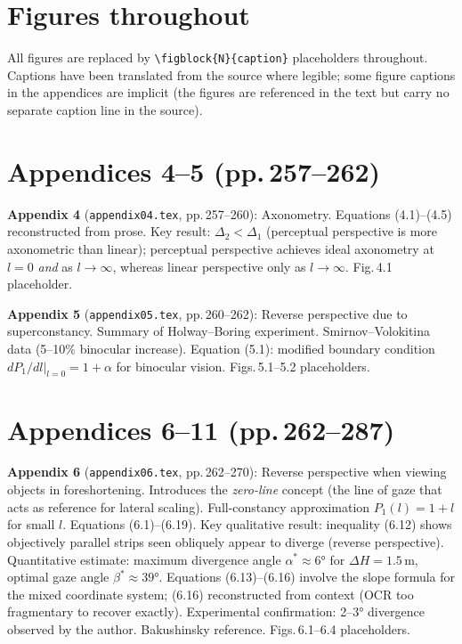 \documentclass[12pt]{article}
\begin{document}
\section*{Figures throughout}

All figures are replaced by \verb|\figblock{N}{caption}| placeholders
throughout. Captions have been translated from the source where legible; some
figure captions in the appendices are implicit (the figures are referenced in
the text but carry no separate caption line in the source).

\section*{Appendices 4--5 (pp.\,257--262)}

\textbf{Appendix 4} (\texttt{appendix04.tex}, pp.\,257--260): Axonometry. Equations
(4.1)--(4.5) reconstructed from prose. Key result: $\Delta_2 < \Delta_1$ (perceptual
perspective is more axonometric than linear); perceptual perspective achieves ideal
axonometry at $l=0$ \emph{and} as $l\to\infty$, whereas linear perspective only as
$l\to\infty$. Fig.\,4.1 placeholder.

\textbf{Appendix 5} (\texttt{appendix05.tex}, pp.\,260--262): Reverse perspective due to
superconstancy. Summary of Holway--Boring experiment. Smirnov--Volokitina data (5--10\%
binocular increase). Equation (5.1): modified boundary condition
$dP_1/dl|_{l=0} = 1+\alpha$ for binocular vision. Figs.\,5.1--5.2 placeholders.

\section*{Appendices 6--11 (pp.\,262--287)}

\textbf{Appendix 6} (\texttt{appendix06.tex}, pp.\,262--270): Reverse perspective when
viewing objects in foreshortening. Introduces the \emph{zero-line} concept (the line
of gaze that acts as reference for lateral scaling). Full-constancy approximation
$P_1(l)=1+l$ for small $l$. Equations (6.1)--(6.19). Key qualitative result:
inequality (6.12) shows objectively parallel strips seen obliquely appear to diverge
(reverse perspective). Quantitative estimate: maximum divergence angle
$\alpha^* \approx 6°$ for $\Delta H = 1.5$\,m, optimal gaze angle $\beta^* \approx 39°$.
Equations (6.13)--(6.16) involve the slope formula for the mixed coordinate system;
(6.16) reconstructed from context (OCR too fragmentary to recover exactly).
Experimental confirmation: 2--3° divergence observed by the author. Bakushinsky
reference. Figs.\,6.1--6.4 placeholders.
\end{document}
